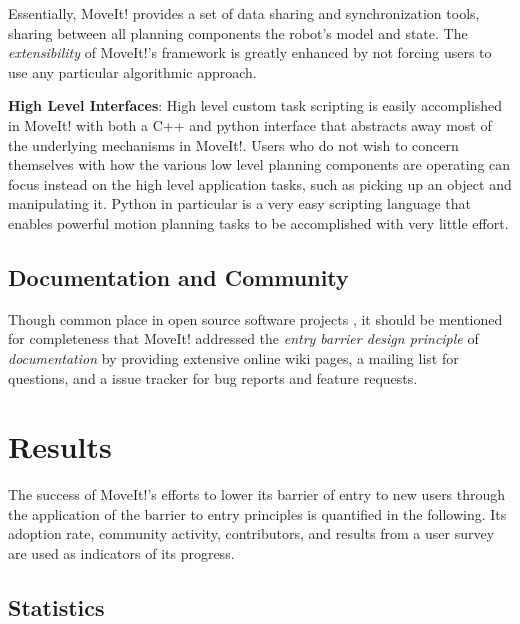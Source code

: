 \documentclass[10pt,journal,compsoc]{joser1}
\begin{document}
{Essentially, MoveIt! provides a set of data sharing and synchronization tools,
sharing between all planning components the robot's model and state. The
\textit{extensibility} of MoveIt!'s framework is greatly enhanced by not forcing
users to use any particular algorithmic approach. 

{\bf High Level Interfaces}: High level custom task scripting is easily
accomplished in MoveIt! with both a C++ and python interface that abstracts away
most of the underlying mechanisms in MoveIt!. Users who do not wish to concern
themselves with how the various low level planning components are operating can
focus instead on the high level application tasks, such as picking up an object
and manipulating it. Python in particular is a very easy scripting language that
enables powerful motion planning tasks to be accomplished with very little
effort.

\subsection{Documentation and Community}

Though common place in open source software projects \cite{bruyninckx2001open},
it should be mentioned for completeness that MoveIt! addressed the \textit{entry
barrier design principle} of \textit{documentation} by providing extensive
online wiki pages, a mailing list for questions, and a issue tracker for bug
reports and feature requests.

\section{Results}
\label{sec::results}

The success of MoveIt!'s efforts to lower its barrier of entry to new users
through the application of the barrier to entry principles is quantified in the
following. Its adoption rate, community activity, contributors, and results from
a user survey are used as indicators of its progress.

\subsection{Statistics}
\label{sec::statistics}

}
\end{document}
